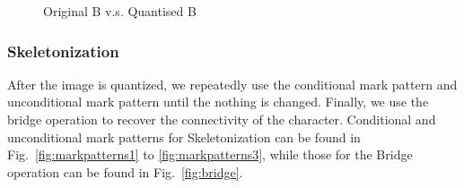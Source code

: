 \documentclass{article}
\begin{document}
\begin{figure}
\caption{Original B v.s. Quantised B}
\end{figure}

\subsubsection{Skeletonization}
After the image is quantized, we repeatedly use the conditional mark pattern and unconditional mark pattern until the nothing is changed. Finally, we use the bridge operation to recover the connectivity of the character. Conditional and unconditional mark patterns for Skeletonization can be found in Fig.~\ref{fig:markpatterns1} to \ref{fig:markpatterns3}, while those for the Bridge operation can be found in Fig.~\ref{fig:bridge}.
\end{document}
